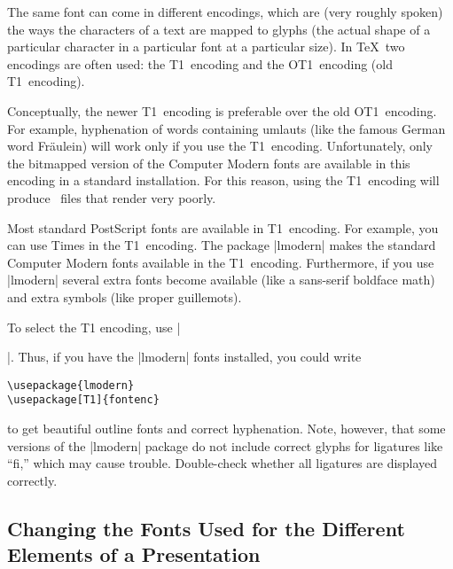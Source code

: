 The same font can come in different encodings, which are (very roughly
spoken) the ways the characters of a text are mapped to glyphs (the
actual shape of a particular character in a particular font at a
particular size). In \TeX\ two encodings are often used: the
T1~encoding and the OT1~encoding (old T1~encoding).

Conceptually, the newer T1~encoding is preferable over the old
OT1~encoding. For example, hyphenation of words containing umlauts
(like the famous German word Fr\"aulein) will work only if you use the
T1~encoding. Unfortunately, only the bitmapped version of the Computer
Modern fonts are available in this encoding in a standard
installation. For this reason, using the T1~encoding will produce
\pdf\ files that render very poorly.

Most standard PostScript fonts are available in T1~encoding. For
example, you can use Times in the T1~encoding. The package |lmodern|
makes the standard Computer Modern fonts available in the
T1~encoding. Furthermore, if you use |lmodern| several extra fonts
become available (like a sans-serif boldface math) and extra symbols
(like proper guillemots).

To select the T1 encoding, use |\usepackage[T1]{fontenc}|. Thus, if
you have the |lmodern| fonts installed, you could write
\begin{verbatim}
\usepackage{lmodern}
\usepackage[T1]{fontenc}
\end{verbatim}
to get beautiful outline fonts and correct hyphenation. Note, however,
that some versions of the |lmodern| package do not include correct
glyphs for ligatures like ``fi,'' which may cause
trouble. Double-check whether all ligatures are displayed correctly.





\subsection{Changing the Fonts Used for the Different Elements of a Presentation}




